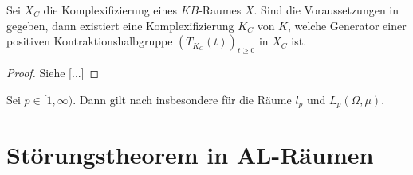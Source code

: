 
\begin{satz}\label{Hauptaussage im Komplexen}
Sei $X_C$ die Komplexifizierung eines $KB$-Raumes $X$. Sind die Voraussetzungen in   gegeben, dann existiert eine Komplexifizierung $K_C$ von $K$, welche Generator einer positiven Kontraktionshalbgruppe $(T_{K_C}(t))_{t\geq0}$ in  $X_C$ ist.
\end{satz}

\begin{proof}
Siehe [...]
\end{proof}


\par
\begin{bem}
Sei $p\in[1,\infty)$. Dann gilt  nach \Cref{} insbesondere für die Räume $l_p$ und  $L_p(\Omega, \mu)$.
\end{bem}

\section{Störungstheorem in AL-Räumen}


